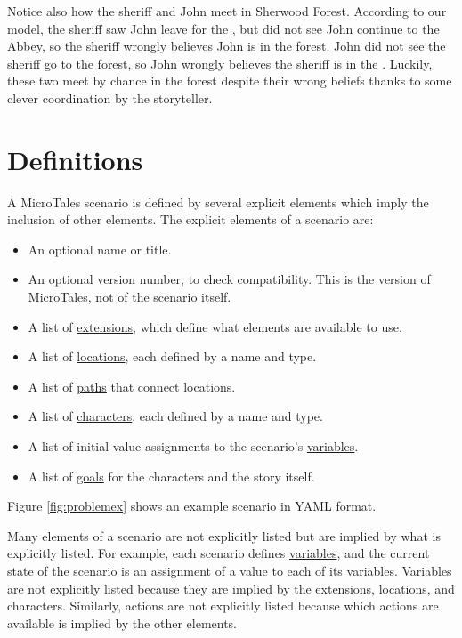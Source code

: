 \documentclass{nilreport}
\begin{document}
Notice also how the sheriff and John meet in Sherwood Forest. According to our model, the sheriff saw John leave for the , but did not see John continue to the Abbey, so the sheriff wrongly believes John is in the forest. John did not see the sheriff go to the forest, so John wrongly believes the sheriff is in the . Luckily, these two meet by chance in the forest despite their wrong beliefs thanks to some clever coordination by the storyteller.

\newpage

\section{Definitions}

A MicroTales scenario is defined by several explicit elements which imply the inclusion of other elements. The explicit elements of a scenario are:
\begin{itemize}
	\item An optional name or title.
	\item An optional version number, to check compatibility. This is the version of MicroTales, not of the scenario itself.
	\item A list of \hyperref[sec:extensions]{extensions}, which define what elements are available to use.
	\item A list of \hyperref[sec:locations]{locations}, each defined by a name and type.
	\item A list of \hyperref[sec:locations]{paths} that connect locations.
	\item A list of \hyperref[sec:characters]{characters}, each defined by a name and type.
	\item A list of initial value assignments to the scenario's \hyperref[sec:variables]{variables}.
	\item A list of \hyperref[sec:goals]{goals} for the characters and the story itself.
\end{itemize}

\noindent Figure \ref{fig:problemex} shows an example scenario in YAML format.

Many elements of a scenario are not explicitly listed but are implied by what is explicitly listed. For example, each scenario defines \hyperref[sec:variables]{variables}, and the current state of the scenario is an assignment of a value to each of its variables. Variables are not explicitly listed because they are implied by the extensions, locations, and characters. Similarly, actions are not explicitly listed because which actions are available is implied by the other elements.
\end{document}
